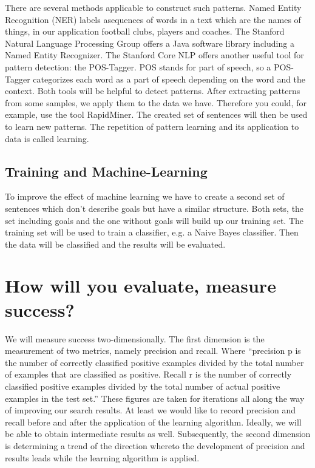\documentclass[11pt,titlepage,oneside,openany]{book}
\begin{document}
There are several methods applicable to construct such patterns. Named Entity Recognition (NER) labels asequences of words in a text which are the names of things, in our application football clubs, players and coaches. The Stanford Natural Language Processing Group offers a Java software library including a Named Entity Recognizer. The Stanford Core NLP offers another useful tool for pattern detection: the POS-Tagger. POS stands for part of speech, so a POS-Tagger categorizes each word as a part of speech depending on the word and the context. Both tools will be helpful to detect patterns.
After extracting patterns from some samples, we apply them to the data we have. Therefore you could, for example, use the tool RapidMiner. The created set of sentences will then be used to learn new patterns. The  repetition of pattern learning and its application to data is called learning.

\subsection{Training and Machine-Learning}
To improve the effect of machine learning we have to create a second set of sentences which don’t describe goals but have a similar structure. 
Both sets, the set including goals and the one without goals will build up our training set. The training set will be used to train a classifier, e.g. a Naive Bayes classifier. Then the data will be classified and the results will be evaluated.

\section{How will you evaluate, measure success?}

We will measure success two-dimensionally. The first dimension is the measurement of two metrics, namely precision and recall. Where “precision p is the number of correctly classified positive examples divided by the total number of examples that are classified as positive. Recall r is the number of correctly classified positive examples divided by the total number of actual positive examples in the test set.” \cite[p.103]{Liu2007} These figures are taken for iterations all along the way of improving our search results. At least we would like to record precision and recall before and after the application of the learning algorithm. Ideally, we will be able to obtain intermediate results as well. Subsequently, the second dimension is determining a trend of the direction whereto the development of precision and results leads while the learning algorithm is applied.



\end{document}
